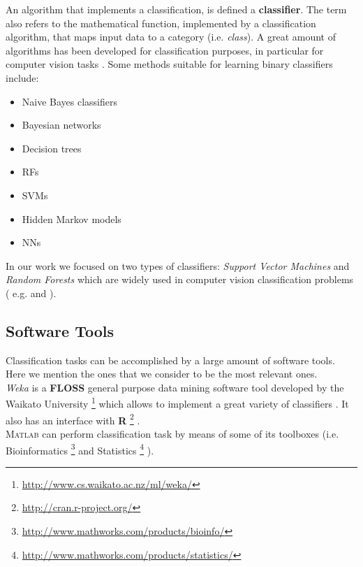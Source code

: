An algorithm that implements a classification, is defined a \textbf{classifier}.
The term also refers to the mathematical function, implemented by a classification algorithm, that maps input data to a category (i.e. \textit{class}).
A great amount of algorithms has been developed for classification purposes, in particular for computer vision tasks \cite{classificationSurvey}.
Some methods suitable for learning binary classifiers include\cite{dataMiningBook}:

\begin{itemize}
 \item Naive Bayes classifiers
 \item Bayesian networks \ \cite{bayesClassifiersCellSegmentation}
 \item Decision trees \ \cite{randTree01}
 \item \Glspl{RF} \ \cite{randForests01}
 \item \Glspl{SVM} \ \cite{SVM01}
 \item Hidden Markov models
 \item \Glspl{NN} \ \cite{russell2010artificial}
\end{itemize}


In our work we focused on two types of classifiers: \textit{Support Vector Machines} and \textit{Random Forests}
which are widely used in computer vision classification problems ( e.g. \cite{mitosisDetectionLearningBased} and \cite{randForests04}).

\subsection{Software Tools}

Classification tasks can be accomplished by a large amount of software tools. Here we mention the ones that we consider to be the most relevant ones.\\
\textit{Weka} \cite{dataMining_Weka, dataMining_Weka_upd} is a \textbf{FLOSS} general purpose data mining software tool developed by the Waikato University
\footnote{\url{http://www.cs.waikato.ac.nz/ml/weka/}} which allows to implement a great variety of classifiers \cite{dataMiningBook}. It also has an interface
with \textbf{R} \footnote{\url{http://cran.r-project.org/}} \cite{hornik2009open}.\\
{\scshape Matlab} can perform classification task by means of some of its toolboxes (i.e. Bioinformatics \footnote{\url{http://www.mathworks.com/products/bioinfo/} }
and Statistics \footnote{\url{http://www.mathworks.com/products/statistics/} } ).


\vspace{0.5cm}

